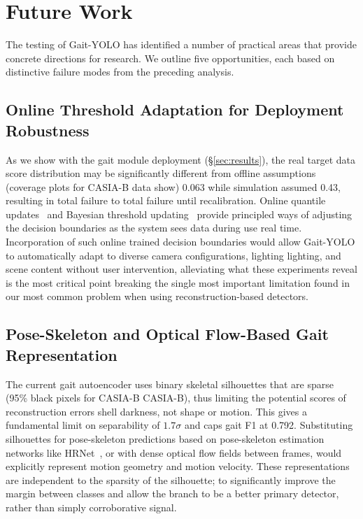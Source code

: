 \documentclass[conference]{IEEEtran}
\begin{document}
\section{Future Work}\label{sec:future}

The testing of Gait-YOLO has identified a number of practical
areas that provide concrete directions for research.  We outline
five opportunities, each based on distinctive failure modes from
the preceding analysis.

\subsection{Online Threshold Adaptation for Deployment Robustness}

As we show with the gait module deployment (\S\ref{sec:results}),
the real target data score distribution may be significantly different from
offline assumptions (coverage plots for CASIA-B data show)
0.063 while simulation assumed 0.43, resulting in total failure to
total failure until recalibration.
Online quantile updates~\cite{greenwald2001} and Bayesian
threshold updating~\cite{adams2007} provide principled ways of
adjusting the decision boundaries as the system sees data during use
real time.  Incorporation of such online trained decision boundaries would allow Gait-YOLO
to automatically adapt to diverse camera configurations, lighting
lighting, and scene content without user intervention, alleviating what these experiments reveal is the most critical point
breaking the single most important limitation found in our
most common problem when using reconstruction-based detectors.

\subsection{Pose-Skeleton and Optical Flow-Based Gait Representation}

The current gait autoencoder uses binary skeletal silhouettes
that are sparse (95\% black pixels for CASIA-B
CASIA-B), thus limiting the potential scores of reconstruction errors
shell darkness, not shape or motion.  This
gives a fundamental limit on separability of $1.7\sigma$ and
caps gait F1 at 0.792.
Substituting silhouettes for pose-skeleton predictions
based on pose-skeleton estimation networks like HRNet~\cite{sun2019hrnet},
or with dense optical flow fields between frames,
would explicitly represent motion geometry and motion velocity.  These
representations are independent to the sparsity of the silhouette;
to significantly improve the margin between classes and allow the
branch to be a better primary detector, rather than simply
corroborative signal.
\end{document}
